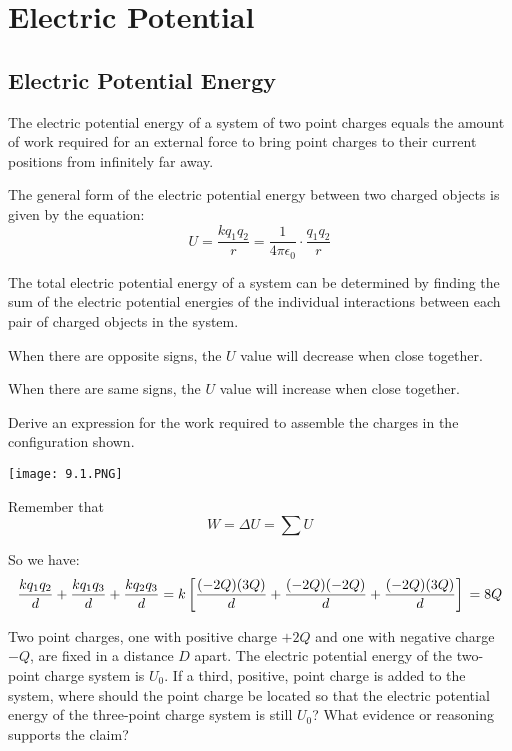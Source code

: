\documentclass[../em.tex]{subfiles}
\begin{document}
\chapter{Electric Potential}
\section{Electric Potential Energy}
The electric potential energy of a system of two point charges equals the amount of 
work required for an external force to bring point charges to their 
current positions from infinitely far away.

The general form of the electric potential energy between
two charged objects is given by the equation:
\[U=\frac{kq_1q_2}{r}=\frac{1}{4\pi\epsilon_0}\cdot\frac{q_1q_2}{r}\]

The total electric potential energy of a system can be determined by 
finding the sum of the electric potential energies of the individual
interactions between each pair of charged objects in the system.

When there are opposite signs, the $U$ value will decrease when close together.

When there are same signs, the $U$ value will increase when close together.

\begin{example}
    Derive an expression for the work required to assemble the charges
    in the configuration shown.
    \begin{center}
        \texttt{[image: 9.1.PNG]}
    \end{center}

    Remember that
    \[W = \Delta U = \sum U\]
    
    So we have:
    \[\frac{kq_1q_2}{d}+\frac{kq_1q_3}{d}+\frac{kq_2q_3}{d}=\\
    k\left[\frac{(-2Q)(3Q)}{d}+\frac{(-2Q)(-2Q)}{d}+\frac{(-2Q)(3Q)}{d}\right]\\
    =8Q\]
\end{example}

\ex Two point charges, one with positive charge $+2Q$ and one with negative charge $-Q$, are fixed in a distance $D$ apart. The electric potential energy of the two-point charge system is $U_0$. If a third, positive, point charge is added to the system,
where should the point charge be located so that the electric potential energy of the three-point charge system is still $U_0$? What evidence or reasoning supports the claim?
\end{document}
